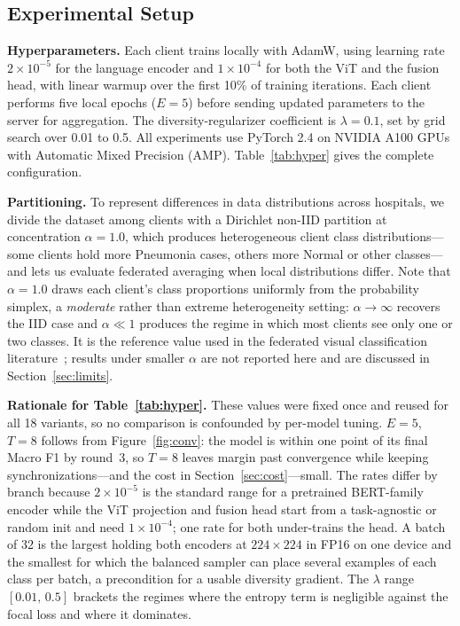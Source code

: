 \documentclass[letterpaper, conference]{IEEEtran}
\begin{document}
\subsection{Experimental Setup}

\textbf{Hyperparameters.}
Each client trains locally with AdamW, using learning rate $2{\times}10^{-5}$ for
the language encoder and $1{\times}10^{-4}$ for both the ViT and the fusion head,
with linear warmup over the first 10\% of training iterations. Each client
performs five local epochs ($E=5$) before sending updated parameters to the
server for aggregation. The diversity-regularizer coefficient is $\lambda=0.1$,
set by grid search over 0.01 to 0.5. All experiments use PyTorch 2.4 on NVIDIA
A100 GPUs with Automatic Mixed Precision (AMP). Table~\ref{tab:hyper} gives the
complete configuration.

\textbf{Partitioning.}
To represent differences in data distributions across hospitals, we divide the
dataset among clients with a Dirichlet non-IID partition at concentration
$\alpha=1.0$, which produces heterogeneous client class distributions---some
clients hold more Pneumonia cases, others more Normal or other classes---and lets
us evaluate federated averaging when local distributions differ. Note that
$\alpha=1.0$ draws each client's class proportions uniformly from the probability
simplex, a \emph{moderate} rather than extreme heterogeneity setting:
$\alpha\!\to\!\infty$ recovers the IID case and $\alpha\!\ll\!1$ produces the
regime in which most clients see only one or two classes. It is the reference
value used in the federated visual classification literature~\cite{Hsu2019};
results under smaller $\alpha$ are not reported here and are discussed in
Section~\ref{sec:limits}.

\textbf{Rationale for Table~\ref{tab:hyper}.}
These values were fixed once and reused for all 18 variants, so no comparison is
confounded by per-model tuning. $E{=}5$, $T{=}8$ follows from
Figure~\ref{fig:conv}: the model is within one point of its final Macro F1 by
round~3, so $T{=}8$ leaves margin past convergence while keeping
synchronizations---and the cost in Section~\ref{sec:cost}---small. The rates
differ by branch because $2{\times}10^{-5}$ is the standard range for a
pretrained BERT-family encoder while the ViT projection and fusion head start
from a task-agnostic or random init and need $1{\times}10^{-4}$; one rate for
both under-trains the head. A batch of 32 is the largest holding both encoders at
$224{\times}224$ in FP16 on one device and the smallest for which the balanced
sampler can place several examples of each class per batch, a precondition for a
usable diversity gradient. The $\lambda$ range $[0.01,\,0.5]$ brackets the
regimes where the entropy term is negligible against the focal loss and where it
dominates.
\end{document}
